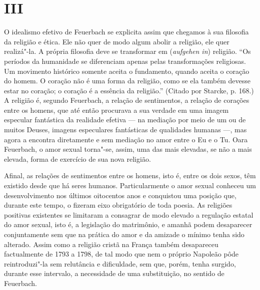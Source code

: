 \section{III}

\noindent{}O idealismo efetivo
de Feuerbach se
explicita assim que chegamos à sua filosofia da religião e ética. Ele
não quer de modo algum abolir a religião, ele quer realizá"-la. A própria
filosofia deve se transformar em (\emph{aufgehen in}) religião. ``Os
períodos da humanidade se diferenciam apenas pelas transformações
religiosas. Um movimento histórico somente aceita o fundamento, quando
aceita o coração do homem. O coração não é uma forma da religião, como
se ela também devesse estar no coração; o coração é a essência da
religião.'' (Citado por Starcke, p. 168.) A religião é,
segundo Feuerbach,
a relação de sentimentos, a relação de corações entre os homens, que até
então procurava a sua verdade em uma imagem especular fantástica da
realidade efetiva --- na mediação por meio de um ou de muitos Deuses,
imagens especulares fantásticas de qualidades humanas ---, mas agora a
encontra diretamente e sem mediação no amor entre o Eu e o Tu.
Oara Feuerbach,
o amor sexual torna"-se, assim, uma das mais elevadas, se não a mais
elevada, forma de exercício de sua nova religião.

Afinal, as relações de sentimentos entre os homens, isto é, entre os
dois sexos, têm existido desde que há seres humanos. Particularmente o
amor sexual conheceu um desenvolvimento nos últimos oitocentos anos e
conquistou uma posição que, durante este tempo, o fizeram eixo
obrigatório de toda poesia. As religiões positivas existentes se
limitaram a consagrar de modo elevado a regulação estatal do amor
sexual, isto é, a legislação do matrimônio, e amanhã podem desaparecer
conjuntamente sem que na prática do amor e da amizade o mínimo tenha
sido alterado. Assim como a religião cristã na França também desapareceu
factualmente de 1793 a 1798, de tal modo que nem o próprio Napoleão pôde
reintroduzi"-la sem relutância e dificuldade, sem que, porém, tenha
surgido, durante esse intervalo, a necessidade de uma substituição, no
sentido
de Feuerbach.

